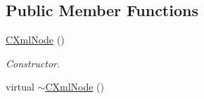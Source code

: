 \subsection*{Public Member Functions}
\begin{DoxyCompactItemize}
\item 
\hyperlink{classxmlnode_1_1_c_xml_node_a0f05b63e034bb5620609a2020c591d55}{C\+Xml\+Node} ()
\begin{DoxyCompactList}\small\item\em Constructor. \end{DoxyCompactList}\item 
\hypertarget{classxmlnode_1_1_c_xml_node_ad3e072fa0d46c534c08f013405e051ae}{virtual \hyperlink{classxmlnode_1_1_c_xml_node_ad3e072fa0d46c534c08f013405e051ae}{$\sim$\+C\+Xml\+Node} ()}\label{classxmlnode_1_1_c_xml_node_ad3e072fa0d46c534c08f013405e051ae}


\end{DoxyCompactItemize}
